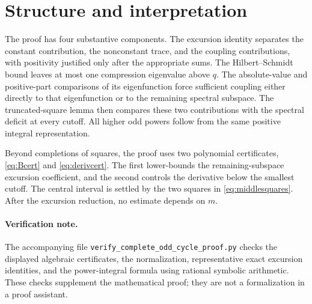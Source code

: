 \documentclass[11pt]{article}
\numberwithin{equation}{section}
\theoremstyle{remark}
\begin{document}
\section*{Structure and interpretation}
The proof has four substantive components. The excursion identity separates the constant contribution, the nonconstant trace, and the coupling contributions, with positivity justified only after the appropriate sums. The Hilbert--Schmidt bound leaves at most one compression eigenvalue above $q$. The absolute-value and positive-part comparisons of its eigenfunction force sufficient coupling either directly to that eigenfunction or to the remaining spectral subspace. The truncated-square lemma then compares these two contributions with the spectral deficit at every cutoff. All higher odd powers follow from the same positive integral representation.

Beyond completions of squares, the proof uses two polynomial certificates, \eqref{eq:Bcert} and \eqref{eq:derivcert}. The first lower-bounds the remaining-subspace excursion coefficient, and the second controls the derivative below the smallest cutoff. The central interval is settled by the two squares in \eqref{eq:middlesquares}. After the excursion reduction, no estimate depends on $m$.

\paragraph{Verification note.}
The accompanying file \nolinkurl{verify_complete_odd_cycle_proof.py} checks the displayed algebraic certificates, the normalization, representative exact excursion identities, and the power-integral formula using rational symbolic arithmetic. These checks supplement the mathematical proof; they are not a formalization in a proof assistant.



\end{document}
